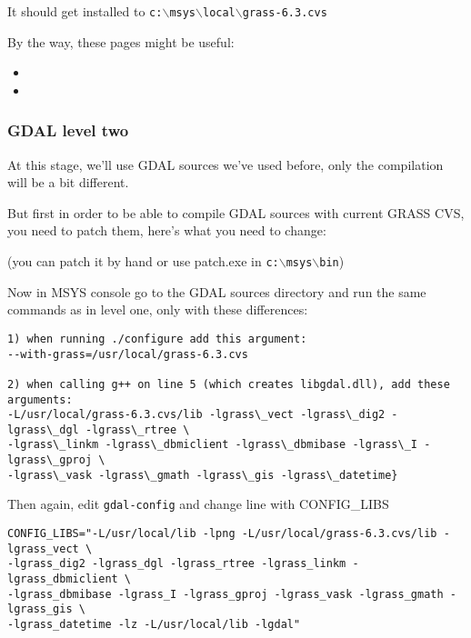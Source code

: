 It should get installed to \texttt{c:$\backslash$msys$\backslash$local$\backslash$grass-6.3.cvs}

By the way, these pages might be useful:

\begin{itemize}
\item {}
\item {}
\end{itemize}

\subsubsection{GDAL level two}
At this stage, we'll use GDAL sources we've used before, only the compilation will be a bit different.

But first in order to be able to compile GDAL sources with current GRASS CVS, you need to patch them, here's what you need to change:

	\begin{quotation}
	\end{quotation}
(you can patch it by hand or use patch.exe in \texttt{c:$\backslash$msys$\backslash$bin})

Now in MSYS console go to the GDAL sources directory and run the same commands as in level one, only with these differences:

\begin{verbatim}
1) when running ./configure add this argument:
--with-grass=/usr/local/grass-6.3.cvs

2) when calling g++ on line 5 (which creates libgdal.dll), add these arguments: 
-L/usr/local/grass-6.3.cvs/lib -lgrass\_vect -lgrass\_dig2 -lgrass\_dgl -lgrass\_rtree \
-lgrass\_linkm -lgrass\_dbmiclient -lgrass\_dbmibase -lgrass\_I -lgrass\_gproj \ 
-lgrass\_vask -lgrass\_gmath -lgrass\_gis -lgrass\_datetime}
\end{verbatim}

Then again, edit \texttt{gdal-config} and change line with CONFIG\_LIBS

\begin{verbatim}
CONFIG_LIBS="-L/usr/local/lib -lpng -L/usr/local/grass-6.3.cvs/lib -lgrass_vect \
-lgrass_dig2 -lgrass_dgl -lgrass_rtree -lgrass_linkm -lgrass_dbmiclient \
-lgrass_dbmibase -lgrass_I -lgrass_gproj -lgrass_vask -lgrass_gmath -lgrass_gis \
-lgrass_datetime -lz -L/usr/local/lib -lgdal" 
\end{verbatim}

